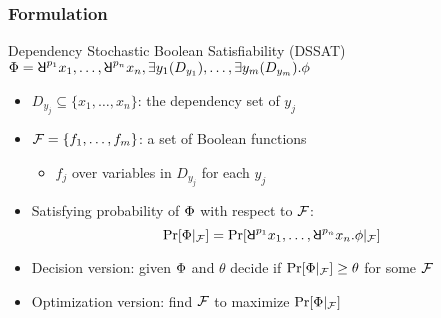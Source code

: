 \begin{frame}
  \frametitle{Formulation}
  \begin{block}{Dependency Stochastic Boolean Satisfiability (DSSAT)}
    \belowdisplayskip=0pt
    $\Qf=\random{p_1} x_1, \ldots, \random{p_n} x_n, \exists y_1(D_{y_1}), \ldots, \exists y_m(D_{y_m}).\pf$
    \pause
    \begin{itemize}
      \item $D_{y_j} \subseteq \{x_1,\ldots,x_n\}$: the \alert{dependency set} of $y_j$
            \pause
      \item $\mathcal{F}=\{f_1,\ldots,f_m\}$: a set of Boolean functions
            \pause
            \begin{itemize}
              \item $f_j$ over variables in $D_{y_j}$ for each $y_j$
            \end{itemize}
            \pause
      \item Satisfying probability of $\Phi$ with respect to $\mathcal{F}$:
            \pause
            \begin{equation*}
              \spb{\pcf{\Qf}{\skf}}=\Pr[\random{p_1} x_1, \ldots, \random{p_n} x_n.\pf|_{\skf}]
            \end{equation*}
            \pause
      \item Decision version: given $\Phi$ and $\theta$ decide if $\Pr[\Phi|_{\mathcal{F}}] \geq \theta$ for some $\mathcal{F}$
            \pause
      \item Optimization version: find $\mathcal{F}$ to maximize $\Pr[\Phi|_{\mathcal{F}}]$
    \end{itemize}
  \end{block}
\end{frame}

